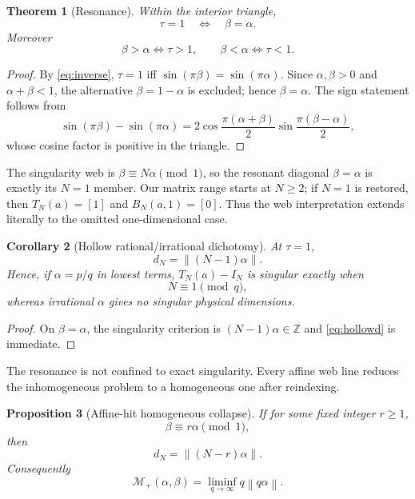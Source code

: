 \documentclass[11pt,reqno]{amsart}
\theoremstyle{plain}
\newtheorem{theorem}{Theorem}
\newtheorem{proposition}[theorem]{Proposition}
\newtheorem{corollary}[theorem]{Corollary}
\theoremstyle{definition}
\newcommand{\BN}{B_N}
\newcommand{\TN}{T_N}
\newcommand{\Z}{\mathbb{Z}}
\newcommand{\norm}[1]{\left\lVert #1\right\rVert}
\begin{document}
\begin{theorem}[Resonance]\label{thm:resonance}
Within the interior triangle,
\begin{equation}\label{eq:resonance}
\boxed{
\tau=1\quad\Longleftrightarrow\quad\beta=\alpha.}
\end{equation}
Moreover
\begin{equation}\label{eq:tau-regions}
\beta>\alpha\iff\tau>1,
\qquad
\beta<\alpha\iff\tau<1.
\end{equation}
\end{theorem}

\begin{proof}
By \eqref{eq:inverse}, $\tau=1$ iff
$\sin(\pi\beta)=\sin(\pi\alpha)$.  Since
$\alpha,\beta>0$ and $\alpha+\beta<1$, the alternative
$\beta=1-\alpha$ is excluded; hence $\beta=\alpha$.  The sign statement follows from
\[
\sin(\pi\beta)-\sin(\pi\alpha)
=2\cos\frac{\pi(\alpha+\beta)}2
 \sin\frac{\pi(\beta-\alpha)}2,
\]
whose cosine factor is positive in the triangle.
\end{proof}

The singularity web is $\beta\equiv N\alpha\pmod1$, so the resonant diagonal
$\beta=\alpha$ is exactly its $N=1$ member.  Our matrix range starts at $N\ge2$;
if $N=1$ is restored, then $\TN(a)=[1]$ and $\BN(a,1)=[0]$.  Thus the web
interpretation extends literally to the omitted one-dimensional case.

\begin{corollary}[Hollow rational/irrational dichotomy]\label{cor:hollowdich}
At $\tau=1$,
\begin{equation}\label{eq:hollowd}
d_N=\norm{(N-1)\alpha}.
\end{equation}
Hence, if $\alpha=p/q$ in lowest terms, $\TN(a)-I_N$ is singular exactly when
\begin{equation}\label{eq:hollowcong}
N\equiv1\pmod q,
\end{equation}
whereas irrational $\alpha$ gives no singular physical dimensions.
\end{corollary}

\begin{proof}
On $\beta=\alpha$, the singularity criterion is
$(N-1)\alpha\in\Z$ and \eqref{eq:hollowd} is immediate.
\end{proof}

The resonance is not confined to exact singularity.  Every affine web line reduces
the inhomogeneous problem to a homogeneous one after reindexing.

\begin{proposition}[Affine-hit homogeneous collapse]\label{prop:affinecollapse}
If for some fixed integer $r\ge1$,
\begin{equation}\label{eq:affinehit}
\beta\equiv r\alpha\pmod1,
\end{equation}
then
\begin{equation}\label{eq:affinehom}
\boxed{d_N=\norm{(N-r)\alpha}.}
\end{equation}
Consequently
\begin{equation}\label{eq:Mhom}
\mathcal M_+(\alpha,\beta)
=\liminf_{q\to\infty}q\norm{q\alpha}.
\end{equation}
\end{proposition}
\end{document}
